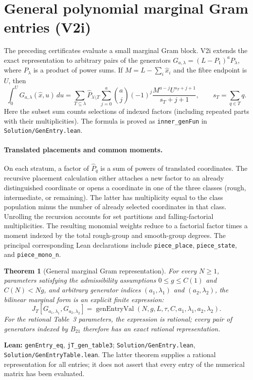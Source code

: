 \documentclass[11pt]{article}
\newtheorem{theorem}{Theorem}[section]
\newcommand{\code}[1]{\texttt{#1}}
\begin{document}
\section{General polynomial marginal Gram entries (V2i)}\label{sec:v2i}
The preceding certificates evaluate a small marginal Gram block. V2i extends
the exact representation to arbitrary pairs of the generators
$G_{a,\lambda}=(L-P_1)^a P_{\lambda}$, where $P_{\lambda}$ is a product of
power sums. If $M=L-\sum_i\widehat x_i$ and the fibre endpoint is $U$, then
\begin{equation}\label{eq:general-inner}
\int_0^U G_{a,\lambda}(\widehat x,u)\,du
=\sum_{T\subseteq\lambda}\widehat P_{\lambda\setminus T}
  \sum_{j=0}^{a}\binom aj(-1)^j
  \frac{M^{a-j}U^{s_T+j+1}}{s_T+j+1},
\qquad s_T=\sum_{q\in T}q.
\end{equation}
Here the subset sum counts selections of indexed factors (including repeated
parts with their multiplicities). The formula is proved as
\code{inner\_genFun} in \nolinkurl{Solution/GenEntry.lean}.

\paragraph{Translated placements and common moments.}
On each stratum, a factor of $\widehat P_q$ is a sum of powers of translated
coordinates. The recursive placement calculation either attaches a new
factor to an already distinguished coordinate or opens a coordinate in one
of the three classes (rough, intermediate, or remaining). The latter has
multiplicity equal to the class population minus the number of already
selected coordinates in that class. Unrolling the recursion accounts for
set partitions and falling-factorial multiplicities. The resulting
monomial weights reduce to a factorial factor times a moment indexed by
the total rough-group and smooth-group degrees. The principal corresponding
Lean declarations include \code{piece\_place}, \code{piece\_state}, and
\code{piece\_mono\_n}.

\begin{theorem}[General marginal Gram representation]\label{thm:genentry}
For every $N\ge1$, parameters satisfying the admissibility assumptions
$0\le g\le C(1)$ and $C(N)<Ng$, and arbitrary generator indices
$(a_1,\lambda_1)$ and $(a_2,\lambda_2)$, the bilinear marginal form is an
explicit finite expression:
\[
 J_T[G_{a_1,\lambda_1},G_{a_2,\lambda_2}]
 =\operatorname{genEntryVal}(N,g,L,\tau,C,
                 a_1,\lambda_1,a_2,\lambda_2).
\]
For the rational Table~3 parameters, the expression is rational; every
pair of generators indexed by $B_{21}$ therefore has an exact rational
representation.
\end{theorem}
\noindent\textbf{Lean:} \code{genEntry\_eq}, \code{jT\_gen\_table3};
\nolinkurl{Solution/GenEntry.lean}, \nolinkurl{Solution/GenEntryTable.lean}.
The latter theorem supplies a rational representation for all entries; it
does not assert that every entry of the numerical matrix has been evaluated.
\end{document}
